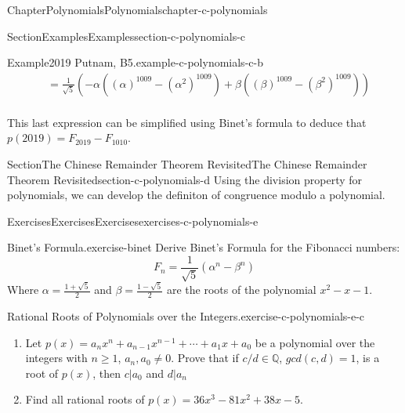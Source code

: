 \documentclass[oneside,10pt,]{book}
\numberwithin{equation}{section}
\begin{document}
\begin{chapterptx}{Chapter}{Polynomials}{}{Polynomials}{}{}{chapter-c-polynomials}
\begin{sectionptx}{Section}{Examples}{}{Examples}{}{}{section-c-polynomials-c}
\begin{example}{Example}{2019 Putnam, B5.}{example-c-polynomials-c-b}
\begin{equation*}
\begin{split}
&=\frac{1}{\sqrt{5}}\left(-\alpha((\alpha)^{1009} -(\alpha^2)^{1009} )
+\beta  ((\beta)^{1009} -(\beta^2)^{1009} )
\right)\\                       
\end{split}
\end{equation*}
%
\par
This last expression can be simplified using Binet's formula to deduce that \(p(2019) = F_{2019} - F_{1010}\).%
\end{example}
\end{sectionptx}
%
%
\typeout{************************************************}
\typeout{************************************************}
%
\begin{sectionptx}{Section}{The Chinese Remainder Theorem Revisited}{}{The Chinese Remainder Theorem Revisited}{}{}{section-c-polynomials-d}
Using the division property for polynomials, we can develop the definiton of congruence modulo a polynomial.%
\end{sectionptx}
%
%
\typeout{************************************************}
\typeout{************************************************}
%
\begin{exercises-section}{Exercises}{Exercises}{}{Exercises}{}{}{exercises-c-polynomials-e}
\begin{divisionexercise}{1}{Binet's Formula.}{}{exercise-binet}%
%
Derive Binet's Formula for the Fibonacci numbers:%
\begin{equation*}
F_n=\frac{1}{\sqrt{5}}(\alpha^{n}-\beta^{n})
\end{equation*}
Where \(\alpha=\frac{1+\sqrt{5}}{2}\) and \(\beta=\frac{1-\sqrt{5}}{2}\) are the roots of the polynomial \(x^2-x-1\).%
\end{divisionexercise}%
\begin{divisionexercise}{2}{Rational Roots of Polynomials over the Integers.}{}{exercise-c-polynomials-e-c}%
%
\begin{enumerate}[label=(\alph*)]
\item{}Let \(p(x)= a_n x^n + a_{n-1}x^{n-1}+ \cdots +a_1 x + a_0\) be a polynomial over the integers with \(n\geq 1\), \(a_n, a_0 \neq 0\).  Prove that if \(c/d \in \mathbb{Q}\), \(gcd(c,d)=1\), is a root of \(p(x)\), then  \(c \vert a_0\) and \(d \vert a_n\)%
\item{}Find all rational roots of \(p(x)=36 x^3-81 x^2+38 x-5\).%
\end{enumerate}

\end{divisionexercise}
\end{exercises-section}
\end{chapterptx}
\end{document}
